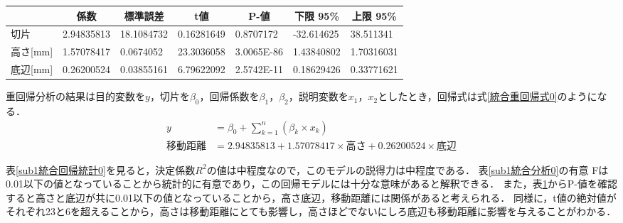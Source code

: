 \documentclass[titlepage,a4paper]{jsarticle}
\begin{document}
\begin{table}[H]
\begin{minipage}[c]{1\hsize}
    \label{sub2統合分析0}
    \begin{tabular}{l|llllll}
      \multicolumn{1}{c|}{} & \multicolumn{1}{c}{係数} & \multicolumn{1}{c}{標準誤差} & \multicolumn{1}{c}{t値} & \multicolumn{1}{c}{P-値} & \multicolumn{1}{c}{下限 95\%} & \multicolumn{1}{c}{上限 95\%} \\\hline\hline
      切片                    & 2.94835813             & 18.1084732               & 0.16281649             & 0.8707172               & -32.614625                  & 38.511341                   \\
      高さ[mm]                & 1.57078417             & 0.0674052                & 23.3036058             & 3.0065E-86              & 1.43840802                  & 1.70316031                  \\
      底辺[mm]                & 0.26200524             & 0.03855161               & 6.79622092             & 2.5742E-11              & 0.18629426                  & 0.33771621                  \\\hline
    \end{tabular}
  \end{minipage}
\end{table}

重回帰分析の結果は目的変数を$y$，切片を$\beta_{0}$，回帰係数を$\beta_{1}$，$\beta_{2}$，説明変数を$x_{1}$，$x_{2}$としたとき，回帰式は式\eqref{統合重回帰式0}のようになる．
\begin{align}
  y    & = \beta_{0}+\sum_{k=1}^{n}\left(\beta_{k} \times x_{k}\right)              \\
  移動距離 & = 2.94835813 + 1.57078417  \times 高さ+ 0.26200524 \times 底辺 \label{統合重回帰式0}
\end{align}

表\ref{sub1統合回帰統計0}を見ると，決定係数$R^{2}$の値は中程度なので，このモデルの説得力は中程度である．
表\ref{sub1統合分析0}の有意 Fは0.01以下の値となっていることから統計的に有意であり，この回帰モデルには十分な意味があると解釈できる．
また，表\ref{sub2統合分析0}からP-値を確認すると高さと底辺が共に0.01以下の値となっていることから，高さ底辺，移動距離には関係があると考えられる．
同様に，t値の絶対値がそれぞれ23と6を超えることから，高さは移動距離にとても影響し，高さほどでないにしろ底辺も移動距離に影響を与えることがわかる．
\end{document}
